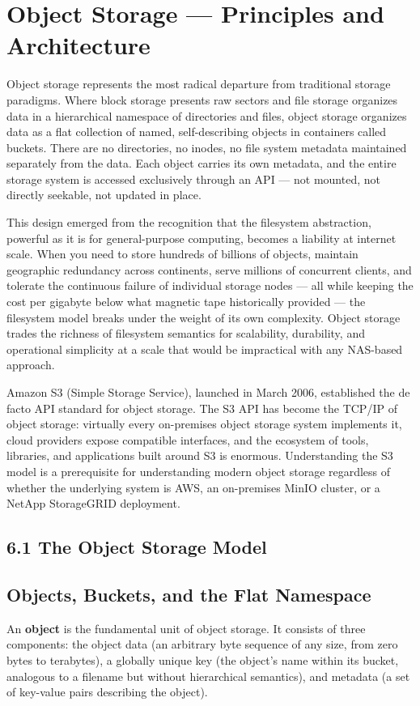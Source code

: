 \chapter{Object Storage --- Principles and Architecture}
\label{ch:9}

Object storage represents the most radical departure from traditional storage paradigms. Where block storage presents raw sectors and file storage organizes data in a hierarchical namespace of directories and files, object storage organizes data as a flat collection of named, self-describing objects in containers called buckets. There are no directories, no inodes, no file system metadata maintained separately from the data. Each object carries its own metadata, and the entire storage system is accessed exclusively through an API --- not mounted, not directly seekable, not updated in place.

This design emerged from the recognition that the filesystem abstraction, powerful as it is for general-purpose computing, becomes a liability at internet scale. When you need to store hundreds of billions of objects, maintain geographic redundancy across continents, serve millions of concurrent clients, and tolerate the continuous failure of individual storage nodes --- all while keeping the cost per gigabyte below what magnetic tape historically provided --- the filesystem model breaks under the weight of its own complexity. Object storage trades the richness of filesystem semantics for scalability, durability, and operational simplicity at a scale that would be impractical with any NAS-based approach.

Amazon S3 (Simple Storage Service), launched in March 2006, established the de facto API standard for object storage. The S3 API has become the TCP/IP of object storage: virtually every on-premises object storage system implements it, cloud providers expose compatible interfaces, and the ecosystem of tools, libraries, and applications built around S3 is enormous. Understanding the S3 model is a prerequisite for understanding modern object storage regardless of whether the underlying system is AWS, an on-premises MinIO cluster, or a NetApp StorageGRID deployment.

\section{6.1 The Object Storage Model}
\section{Objects, Buckets, and the Flat Namespace}
An \textbf{object} is the fundamental unit of object storage. It consists of three components: the object data (an arbitrary byte sequence of any size, from zero bytes to terabytes), a globally unique key (the object's name within its bucket, analogous to a filename but without hierarchical semantics), and metadata (a set of key-value pairs describing the object).

